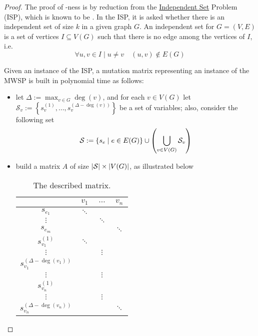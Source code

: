 \begin{proof}
    The proof of \NPHard-ness is by reduction from the \href{https://en.wikipedia.org/wiki/Independent_set_(graph_theory)}{Independent Set} Problem (ISP), which is known to be \NPHard \cite{hochbaum}. In the ISP, it is asked whether there is an independent set of size $k$ in a given graph $G$. An independent set for $G = (V, E)$ is a set of vertices $I \subseteq V(G)$ such that there is no edge among the vertices of $I$, i.e. $$\forall u, v \in I \mid u \neq v \quad (u, v) \notin E(G)$$

    Given an instance of the ISP, a mutation matrix representing an instance of the MWSP is built in polynomial time as follows:

    \begin{itemize}
        \item let $\Delta := \max_{v \in G}{\deg(v)}$, and for each $v \in V(G)$ let $\mathcal S_v := \left\{s_v^{(1)}, \ldots, s_v^{(\Delta - \deg(v))}\right\}$ be a set of variables; also, consider the following set $$\mathcal S := \left\{s_e \mid e \in E(G)\right\} \cup \left(\bigcup_{v \in V(G)}{\mathcal S_v}\right)$$
        \item build a matrix $A$ of size $\left|\mathcal S\right| \times \left|V(G)\right|$, as illustrated below

            \begin{table}[H]
                \centering
                \begin{tabular}{c|ccc}
                          & $v_1$ & $\ldots$ & $v_n$ \\
                    \hline
                    $s_{e_1}$ & $\ddots$ & & \\
                    $\vdots$ & & $\ddots$ & \\
                    $s_{e_m}$ & & & $\ddots$ \\
                    \hline
                    $s_{v_1}^{(1)}$ & $\ddots$ & & \\
                    $\vdots$ & & $\vdots$ & \\
                    $s_{v_1}^{(\Delta - \deg(v_1))}$ & & & \\
                    $\vdots$ & & $\vdots$ & \\
                    $s_{v_n}^{(1)}$ & &  & \\
                    $\vdots$ & & $\vdots$ & \\
                    $s_{v_n}^{(\Delta - \deg(v_n))}$ & & & $\ddots$
                \end{tabular}
                \caption{The described matrix.}
            \end{table}


\end{itemize}
\end{proof}
